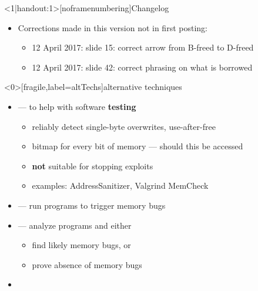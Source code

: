 \begin{frame}
    \titlepage
\end{frame}

{
\begin{frame}<1|handout:1>[noframenumbering]{Changelog}
    \begin{itemize}
        \item Corrections made in this version not in first posting:
        \begin{itemize}
            \item 12 April 2017: slide 15: correct arrow from B-freed to D-freed
            \item 12 April 2017: slide 42: correct phrasing on what is borrowed
        \end{itemize}
    \end{itemize}
\end{frame}
}


\begin{frame}<0>[fragile,label=altTechs]{alternative techniques}
    \begin{itemize}
        \item {} --- to help with software \textbf{testing}
            \begin{itemize}
            \item reliably detect single-byte overwrites, use-after-free
            \item bitmap for every bit of memory --- should this be accessed
            \item \textbf{not} suitable for stopping exploits
            \item examples: AddressSanitizer, Valgrind MemCheck
            \end{itemize}
        \item {} --- run programs to trigger memory bugs
        \item {} --- analyze programs and either
            \begin{itemize}
            \item find likely memory bugs, or
            \item prove absence of memory bugs
            \end{itemize}
        \item {}
    \end{itemize}
\end{frame}

